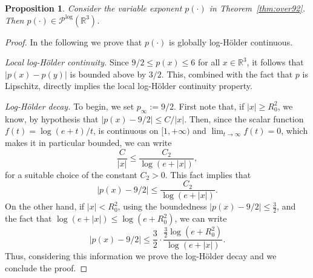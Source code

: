 \documentclass[a4paper,12pt]{amsart}
\theoremstyle{definition}
\theoremstyle{plain}
\newtheorem{proposition}{Proposition}[section]
\def\R{\mathbb{R}}
\def\R{\mathbb R}
\begin{document}
\begin{proposition}\label{prop:pinplog}
Consider the variable exponent $p(\cdot)$ in  Theorem~\ref{thm:over92}. 
Then $p(\cdot) \in \mathcal{P}^{\log}(\mathbb{R}^3)$.
\end{proposition}

\begin{proof}
In the following we prove that $p(\cdot)$ is globally log-Hölder continuous.

\medskip

\noindent\emph{Local log-Hölder continuity.}
Since $ {9}/{2}\leq p(x)\leq 6$ for all $x\in \R^3$, it follows   that $|p(x)-p(y)|$ is bounded above by $3/2$. This,  combined with the fact that $p$ is Lipschitz, directly implies the local log-Hölder continuity property.  
 
\noindent\emph{Log-Hölder decay.} To begin, we set $
p_\infty := 9/2.$ First note that, if  $ |x| \geq R_0^2 $, we know, by hypothesis that $|p(x) - 9/2| \leq C/{|x|}$.
Then, since the scalar function $f(t) = {\log(e + t)}/{t}$, is continuous on $[1,+\infty)$ and $ \lim_{t \to \infty} f(t) = 0 $, which makes it in particular bounded, we can write  
\[
  \frac{C}{|x|} \leq \frac{C_2}{\log(e + |x|)},
\]
for a suitable choice of the constant $C_2>0$. 
This fact implies that 
\[
|p(x) - 9/2|  \leq \frac{C_2}{\log(e + |x|)}.
\]
On the other hand, if $ |x| < R_0^2 $, using the boundedness $|p(x) - 9/2| \leq \frac{3}{2}$, and the fact that $\log(e + |x|) \leq \log(e + R_0^2)$, we can write 
\[
|p(x) - 9/2| \leq \frac{3}{2} \cdot \frac{\frac{3}{2} \log(e + R_0^2)}{\log(e + |x|)}.
\]
Thus, considering this information we prove the log-Hölder decay and we conclude the proof.
\end{proof}
 
\end{document}
